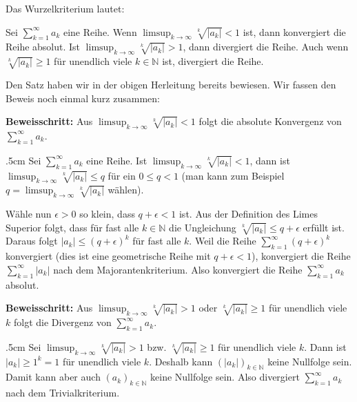 \documentclass[fontsize=9pt,
               parskip=half-,
               DIV=14,
               listof=chapterentry,
               tocflat]{scrbook}
\newenvironment{indentblock}{\begin{adjustwidth}{.5cm}{}}{\end{adjustwidth}}
\newcommand{\proofstep}[1]{\textbf{\textcolor{sblau}{#1}}}
\begin{document}
Das Wurzelkriterium lautet:

\begin{theorem*}[Wurzelkriterium]
Sei $\sum _{k=1}^{\infty }a_{k}$ eine Reihe. Wenn $\limsup _{k\to \infty }{\sqrt[{k}]{|a_{k}|}}<1$ ist, dann konvergiert die Reihe absolut. Ist $\limsup _{k\to \infty }{\sqrt[{k}]{|a_{k}|}}>1$, dann divergiert die Reihe. Auch wenn ${\sqrt[{k}]{|a_{k}|}}\geq 1$ für unendlich viele $k\in \mathbb {N} $ ist, divergiert die Reihe.

\end{theorem*}

\begin{explanation*}[Wurzelkriterium]
Den Satz haben wir in der obigen Herleitung bereits bewiesen. Wir fassen den Beweis noch einmal kurz zusammen:

\end{explanation*}

\begin{proof*}[Wurzelkriterium]
\proofstep{Beweisschritt:}
 Aus $\limsup _{k\to \infty }{\sqrt[{k}]{|a_{k}|}}<1$ folgt die absolute Konvergenz von $\sum _{k=1}^{\infty }a_{k}$.\begin{indentblock}
Sei $\sum _{k=1}^{\infty }a_{k}$ eine Reihe. Ist $\limsup _{k\to \infty }{\sqrt[{k}]{|a_{k}|}}<1$, dann ist $\limsup _{k\to \infty }{\sqrt[{k}]{|a_{k}|}}\leq q$ für ein $0\leq q<1$ (man kann zum Beispiel $q=\limsup _{k\to \infty }{\sqrt[{k}]{|a_{k}|}}$ wählen).

Wähle nun $\epsilon >0$ so klein, dass $q+\epsilon <1$ ist. Aus der Definition des Limes Superior folgt, dass für fast alle $k\in \mathbb {N} $ die Ungleichung ${\sqrt[{k}]{|a_{k}|}}\leq q+\epsilon $ erfüllt ist. Daraus folgt $|a_{k}|\leq (q+\epsilon )^{k}$ für fast alle $k$. Weil die Reihe $\sum _{k=1}^{\infty }(q+\epsilon )^{k}$ konvergiert (dies ist eine geometrische Reihe mit $q+\epsilon <1$), konvergiert die Reihe $\sum _{k=1}^{\infty }|a_{k}|$ nach dem Majorantenkriterium. Also konvergiert die Reihe $\sum _{k=1}^{\infty }a_{k}$ absolut.

\end{indentblock}

\proofstep{Beweisschritt:}
 Aus $\limsup _{k\to \infty }{\sqrt[{k}]{|a_{k}|}}>1$ oder ${\sqrt[{k}]{|a_{k}|}}\geq 1$ für unendlich viele $k$ folgt die Divergenz von $\sum _{k=1}^{\infty }a_{k}$.\begin{indentblock}
Sei $\limsup _{k\to \infty }{\sqrt[{k}]{|a_{k}|}}>1$ bzw. ${\sqrt[{k}]{|a_{k}|}}\geq 1$ für unendlich viele $k$. Dann ist $|a_{k}|\geq 1^{k}=1$ für unendlich viele $k$. Deshalb kann $\left(|a_{k}|\right)_{k\in \mathbb {N} }$ keine Nullfolge sein. Damit kann aber auch $\left(a_{k}\right)_{k\in \mathbb {N} }$ keine Nullfolge sein. Also divergiert $\sum _{k=1}^{\infty }a_{k}$ nach dem Trivialkriterium.

\end{indentblock}

\end{proof*}
\end{document}
